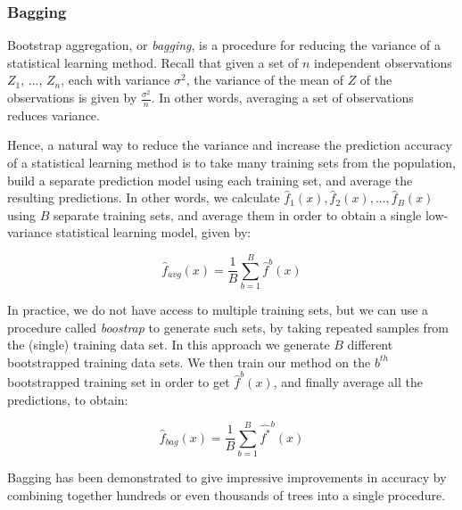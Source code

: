 \subsubsection{Bagging}

Bootstrap aggregation, or \textit{bagging}, is a procedure for reducing the variance of a statistical learning method. Recall that given a set of $n$ independent observations $Z_1$, ..., $Z_n$, each with variance $\sigma^2$, the variance of the mean of $Z$ of the observations is given by $\frac{\sigma^2}{n}$. In other words, averaging a set of observations reduces variance.

Hence, a natural way to reduce the variance and increase the prediction accuracy of a statistical learning method is to take many training sets from the population, build a separate prediction model using each training set, and average the resulting predictions. In other words, we calculate $\hat{f}_1(x), \hat{f}_2(x), ..., \hat{f}_B(x)$ using $B$ separate training sets, and average them in order to obtain a single low-variance statistical learning model, given by:

$$\hat{f}_{avg}(x) = \frac{1}{B} \sum_{b=1}^{B} \hat{f}^b(x)$$

In practice, we do not have access to multiple training sets, but we can use a procedure called \textit{boostrap} to generate such sets, by taking repeated samples from the (single) training data set. In this approach we generate $B$ different bootstrapped training data sets. We then train our method on the $b^{th}$ bootstrapped training set in order to get $\hat{f}^b(x)$, and finally average all the predictions, to obtain:

$$\hat{f}_{bag}(x) = \frac{1}{B} \sum_{b=1}^{B} \hat{f^*}^b(x)$$

Bagging has been demonstrated to give impressive improvements in accuracy by combining together hundreds or even thousands of trees into a single procedure.

